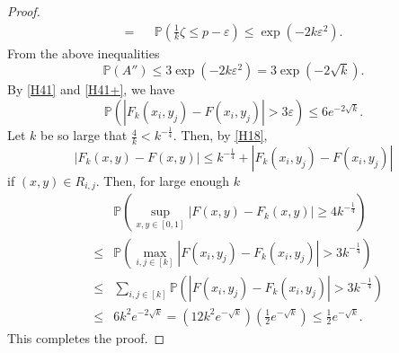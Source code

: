 \documentclass[10pt,a4paper]{amsart}
\def\P{{\mathbb {P}}}                       \def\Q{{\mathbb {Q}}}
\begin{document}
\begin{proof}
\begin{eqnarray*}
= &&   \P\left(\frac{1}{k} \zeta \le p-\varepsilon \right)
\le \exp (-2k \varepsilon^2 ) .
\end{eqnarray*}
From the above inequalities
$$
\P(A'') \le 3 \exp (-2k \varepsilon^2 ) = 3 \exp (-2\sqrt{k}).
$$
By \eqref{H41} and \eqref{H41+}, we have
\begin{equation} \label{H40}
\P \left( |F_k(x_i,y_j) - F(x_i,y_j)| > 3\varepsilon   \right)
\le 6 e^{-2\sqrt{k}} .
\end{equation} 
Let $k$ be so large that $\frac{4}{k} <k^{-\frac{1}{4}}$.
Then, by \eqref{H18},
$$
| F_k(x,y)- F(x,y) |\le   k^{-\frac{1}{4}}+ | F_k(x_i,y_j)- F(x_i,y_j) | 
$$
if $(x,y) \in R_{i,j}$.
Then, for large enough $k$
\begin{eqnarray*} 
&&\P \left( \sup_{x,y\in[0,1]} |F(x,y) -F_k(x,y)| \ge 4 k^{-\frac{1}{4}}   \right) \\
&\le & 
\P \left( \max_{i,j\in[k]} |F(x_i,y_j) -F_k(x_i,y_j)| > 3 k^{-\frac{1}{4}}   \right) \\
&\le & 
\sum_{i,j\in[k]}
\P \left( |F(x_i,y_j) -F_k(x_i,y_j)| > 3 k^{-\frac{1}{4}}   \right) \\
&\le & 
6 k^2 e^{-2\sqrt{k}}
= \left( 12 k^2 e^{-\sqrt{k}} \right) \left(\frac{1}{2} e^{-\sqrt{k}}\right) \le
\frac{1}{2} e^{-\sqrt{k}}.     
\end{eqnarray*}
This completes the proof.
\end{proof}
\end{document}
